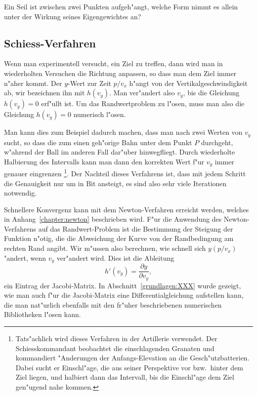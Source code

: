 \begin{aufgabe}
\label{numerik:aufgabe-seil}
Ein Seil ist zwischen zwei Punkten aufgeh"angt, welche Form nimmt es
allein unter der Wirkung seines Eigengewichtes an?
\end{aufgabe}

\subsection{Schiess-Verfahren\label{numerik:schiess-verfahren}}
Wenn man experimentell versucht, ein Ziel zu treffen, dann wird man
in wiederholten Versuchen die Richtung anpassen, so dass man dem Ziel
immer n"aher kommt.
Der $y$-Wert zur Zeit $p/v_x$ h"angt von der Vertikalgeschwindigkeit ab,
wir bezeichnen ihn mit $h(v_y)$.
Man ver"andert also $v_y$, bis die Gleichung $h(v_y)=0$ erf"ullt ist.
Um das Randwertproblem zu l"osen, muss man also die Gleichung $h(v_y)=0$
numerisch l"osen.

Man kann dies zum Beispiel dadurch machen, dass man nach zwei Werten von $v_y$
sucht, so dass die zum einen geh"orige Bahn unter dem Punkt $P$ durchgeht,
w"ahrend der Ball im anderen Fall dar"uber hinwegfliegt.
Durch wiederholte Halbierung des Intervalls kann man dann den korrekten
Wert f"ur $v_y$ immer genauer eingrenzen%
\footnote{%
Tats"achlich wird dieses Verfahren in der Artillerie verwendet.
Der Schiesskommandant beobachtet die einschlagenden Granaten und kommandiert
"Anderungen der Anfangs-Elevation an die Gesch"utzbatterien.
Dabei sucht er Einschl"age, die aus seiner Perspektive vor bzw.~hinter
dem Ziel liegen, und halbiert dann das Intervall, bis die Einschl"age dem
Ziel gen"ugend nahe kommen.}.
Der Nachteil dieses Verfahrens ist, dass mit jedem Schritt die Genauigkeit
nur um in Bit ansteigt, es sind also sehr viele Iterationen notwendig.

Schnellere Konvergenz kann mit dem Newton-Verfahren erreicht werden,
welches in Anhang~\ref{chapter:newton} beschrieben wird.
F"ur die Anwendung des Newton-Verfahrens auf das Randwert-Problem
ist die Bestimmung der Steigung der Funktion n"otig, die die Abweichung
der Kurve von der Randbedingung am rechten Rand angibt.
Wir m"ussen also berechnen, wie schnell sich $y(p/v_x)$ "andert,
wenn $v_y$ ver"andert wird.
Dies ist die Ableitung
\[
h'(v_y)= \frac{\partial y}{\partial v_y},
\]
ein Eintrag der Jacobi-Matrix.
In Abschnitt~\ref{grundlagen:XXX} wurde gezeigt, wie man auch f"ur
die Jacobi-Matrix eine Differentialgleichung aufstellen kann, die
man nat"urlich ebenfalls mit den fr"uher beschriebenen numerischen
Bibliotheken l"osen kann.

